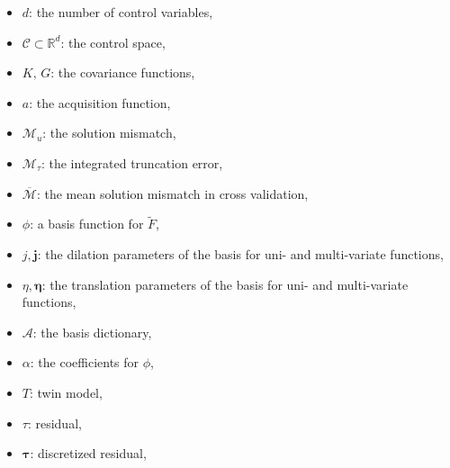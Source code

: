 \begin{itemize}
    \item $d$: the number of control variables,
    \item $\mathcal{C}\subset \mathbb{R}^d$: the control space,
    \item $K,\, G$: the covariance functions,
    \item $a$: the acquisition function,
    \item $\mathcal{M}_u$: the solution mismatch,
    \item $\mathcal{M}_{\tau}$: the integrated truncation error,
    \item $\overline{\mathcal{M}}$: the mean solution mismatch in cross validation,
    \item $\phi$: a basis function for $\tilde{F}$,
    \item $j, \boldsymbol{j}$: the dilation parameters of the basis for uni- and
                               multi-variate functions,
    \item $\eta, \boldsymbol{\eta}$: the translation parameters of the basis for uni- and
                               multi-variate functions,
    \item $\mathcal{A}$: the basis dictionary,
    \item $\alpha$: the coefficients for $\phi$,
    \item $T$: twin model,
    \item $\tau$: residual,
    \item $\boldsymbol{\tau}$: discretized residual,
\end{itemize}


\clearpage
